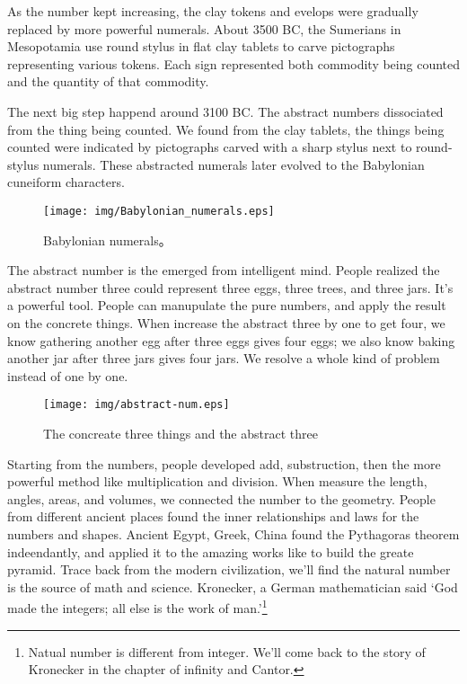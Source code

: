 \documentclass[UTF8]{article}
\begin{document}
As the number kept increasing, the clay tokens and evelops were gradually replaced by more powerful numerals. About 3500 BC, the Sumerians in Mesopotamia use round stylus in flat clay tablets to carve pictographs representing various tokens. Each sign represented both commodity being counted and the quantity of that commodity.

The next big step happend around 3100 BC. The abstract numbers dissociated from the thing being counted. We found from the clay tablets, the things being counted were indicated by pictographs carved with a sharp stylus next to round-stylus numerals. These abstracted numerals later evolved to the Babylonian cuneiform characters.

\begin{figure}[htbp]
 \centering
 \texttt{[image: img/Babylonian\_numerals.eps]}
 \caption{Babylonian numerals\cite{wiki-babylonian-num}。}
 \label{fig:babylonian-num}
\end{figure}

The abstract number is the emerged from intelligent mind. People realized the abstract number three could represent three eggs, three trees, and three jars. It's a powerful tool. People can manupulate the pure numbers, and apply the result on the concrete things. When increase the abstract three by one to get four, we know gathering another egg after three eggs gives four eggs; we also know baking another jar after three jars gives four jars. We resolve a whole kind of problem instead of one by one.

\begin{figure}[htbp]
 \centering
 \texttt{[image: img/abstract-num.eps]}
 \caption{The concreate three things and the abstract three}
 \label{fig:abstract-num}
\end{figure}

Starting from the numbers, people developed add, substruction, then the more powerful method like multiplication and division. When measure the length, angles, areas, and volumes, we connected the number to the geometry. People from different ancient places found the inner relationships and laws for the numbers and shapes. Ancient Egypt, Greek, China found the Pythagoras theorem indeendantly, and applied it to the amazing works like to build the greate pyramid. Trace back from the modern civilization, we'll find the natural number is the source of math and science. Kronecker, a German mathematician said `God made the integers; all else is the work of man.'\footnote{Natual number is different from integer. We'll come back to the story of Kronecker in the chapter of infinity and Cantor.}
\end{document}
